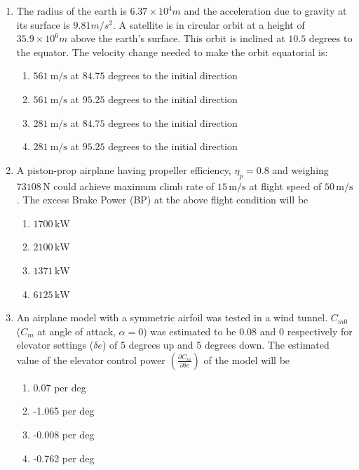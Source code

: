 \documentclass{article}
\begin{document}
\begin{enumerate}
  
    \item The radius of the earth is $6.37 \times 10^4 m$ and the acceleration due to gravity at its surface is $9.81 m/s^2$. A satellite is in circular orbit at a height of $35.9 \times 10^6 m$ above the earth's surface. This orbit is inclined at $10.5$ degrees to the equator. The velocity change needed to make the orbit equatorial is: 
    \begin{enumerate}
        \item $561\ \mathrm{m/s}$ at $84.75$ degrees to the initial direction
        \item $561\ \mathrm{m/s}$ at $95.25$ degrees to the initial direction
        \item $281\ \mathrm{m/s}$ at $84.75$ degrees to the initial direction
        \item $281\ \mathrm{m/s}$ at $95.25$ degrees to the initial direction
    \end{enumerate}
        

    \item A piston-prop airplane having propeller efficiency, $\eta_p = 0.8$ and weighing $73108 \, \mathrm{N}$ could achieve maximum climb rate of $15 \, \mathrm{m/s}$ at flight speed of $50 \, \mathrm{m/s}$. The excess Brake Power (BP) at the above flight condition will be 
    \begin{multicols}{4}
    \begin{enumerate}
        \item $1700 \, \mathrm{kW}$ 
        \item $2100 \, \mathrm{kW}$ 
        \item $1371 \, \mathrm{kW}$ 
        \item $6125 \, \mathrm{kW}$
    \end{enumerate}
    \end{multicols}
        

    \item An airplane model with a symmetric airfoil was tested in a wind tunnel. $C_{m0}$ ($C_m$ at angle of attack, $\alpha = 0$) was estimated to be 0.08 and 0 respectively for elevator settings ($\delta e$) of 5 degrees up and 5 degrees down. The estimated value of the elevator control power $\left( \frac{\partial C_m}{\partial \delta e} \right)$ of the model will be 
    \begin{multicols}{4}
    \begin{enumerate}
        \item 0.07 per deg 
        \item -1.065 per deg 
        \item -0.008 per deg 
        \item -0.762 per deg
    \end{enumerate}
    \end{multicols}
        


\end{enumerate}
\end{document}
